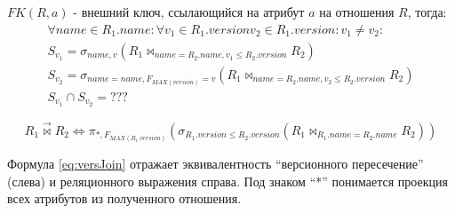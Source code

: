 \indent $FK(R, a)$ - внешний ключ, ссылающийся на атрибут $a$ на отношения $R$, тогда:
\begin{multline*}
	\forall name \in R_1.name : \forall v_1 \in R_1.version v_2 \in R_1.version: v_1 \neq v_2 : \\
		S_{v_1} = \sigma_{name, v}(R_1 \bowtie_{name = R_2.name, v_1 \leq R_2.version}R_2) \\
		S_{v_2} = \sigma_{name = name, F_{MAX(version)} = v}(R_1 \bowtie_{name = R_2.name, v_2 \leq R_2.version}R_2) \\
		S_{v_1} \cap S_{v_2} = ???
\end{multline*}


\begin{equation}
	\label{eq:versJoin}
	R_1\overrightarrow{\bowtie} R_2 \Leftrightarrow \pi_{*, F_{MAX(R_1.version)}}(\sigma_{R_1.version \leq R_2.version}(R_1 \bowtie_{R_1.name = R_2.name}R_2))
\end{equation}

\indent Формула \ref{eq:versJoin} отражает эквивалентность ``версионного пересечение'' (слева) и реляционного выражения справа.
Под знаком ``*'' понимается проекция всех атрибутов из полученного отношения.

